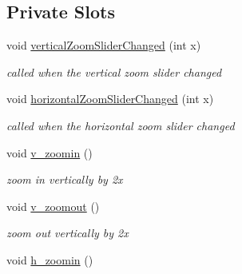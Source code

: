 \subsection*{Private Slots}
\begin{DoxyCompactItemize}
\item 
\hypertarget{class_main_window_a4878ed6cf33c2814e8a7c89e894585bc}{}void \hyperlink{class_main_window_a4878ed6cf33c2814e8a7c89e894585bc}{vertical\+Zoom\+Slider\+Changed} (int x)\label{class_main_window_a4878ed6cf33c2814e8a7c89e894585bc}

\begin{DoxyCompactList}\small\item\em called when the vertical zoom slider changed \end{DoxyCompactList}\item 
\hypertarget{class_main_window_a181da03c02e690223c8f93fe558bb4df}{}void \hyperlink{class_main_window_a181da03c02e690223c8f93fe558bb4df}{horizontal\+Zoom\+Slider\+Changed} (int x)\label{class_main_window_a181da03c02e690223c8f93fe558bb4df}

\begin{DoxyCompactList}\small\item\em called when the horizontal zoom slider changed \end{DoxyCompactList}\item 
\hypertarget{class_main_window_a1bce12a42d710ac9e5afa4d1a0a9aa4b}{}void \hyperlink{class_main_window_a1bce12a42d710ac9e5afa4d1a0a9aa4b}{v\+\_\+zoomin} ()\label{class_main_window_a1bce12a42d710ac9e5afa4d1a0a9aa4b}

\begin{DoxyCompactList}\small\item\em zoom in vertically by 2x \end{DoxyCompactList}\item 
\hypertarget{class_main_window_a9d72b029178eab9350387aa85d608add}{}void \hyperlink{class_main_window_a9d72b029178eab9350387aa85d608add}{v\+\_\+zoomout} ()\label{class_main_window_a9d72b029178eab9350387aa85d608add}

\begin{DoxyCompactList}\small\item\em zoom out vertically by 2x \end{DoxyCompactList}\item 
\hypertarget{class_main_window_ad6d9b74f56b82f77078c2c656abc418b}{}void \hyperlink{class_main_window_ad6d9b74f56b82f77078c2c656abc418b}{h\+\_\+zoomin} ()\label{class_main_window_ad6d9b74f56b82f77078c2c656abc418b}


\end{DoxyCompactItemize}
